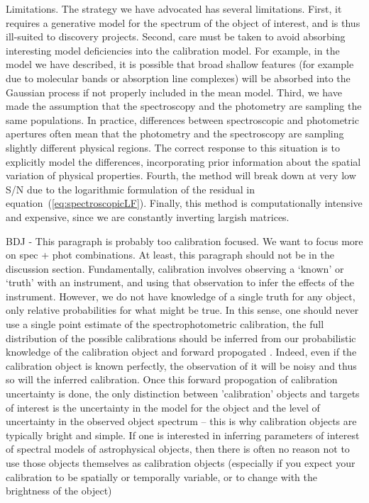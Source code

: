 \documentclass[iop,numberedappendix]{emulateapj}
\begin{document}
Limitations.  The strategy we have advocated has several limitations.
First, it requires a generative model for the spectrum of the object
of interest, and is thus ill-suited to discovery projects.  Second,
care must be taken to avoid absorbing interesting model deficiencies
into the calibration model. For example, in the model we have
described, it is possible that broad shallow features (for example due
to molecular bands or absorption line complexes) will be absorbed into
the Gaussian process if not properly included in the mean
model. Third, we have made the assumption that the spectroscopy and
the photometry are sampling the same populations.  In practice,
differences between spectroscopic and photometric apertures often mean
that the photometry and the spectroscopy are sampling slightly
different physical regions.  The correct response to this situation is
to explicitly model the differences, incorporating prior information
about the spatial variation of physical properties.  Fourth, the
method will break down at very low S/N due to the logarithmic
formulation of the residual in equation~(\ref{eq:spectroscopicLF}).
Finally, this method is computationally intensive and expensive, since
we are constantly inverting largish matrices.

{\color{blue} BDJ - This paragraph is probably too calibration
focused. We want to focus more on spec + phot combinations.  At least,
this paragraph should not be in the discussion section.}
Fundamentally, calibration involves observing a `known' or `truth'
with an instrument, and using that observation to infer the effects of
the instrument.  However, we do not have knowledge of a single truth
for any object, only relative probabilities for what might be true.
In this sense, one should never use a single point estimate of the
spectrophotometric calibration, the full distribution of the possible
calibrations should be inferred from our probabilistic knowledge of
the calibration object and forward propogated
\citep[e.g.][]{lee11}. Indeed, even if the calibration object is known
perfectly, the observation of it will be noisy and thus so will the
inferred calibration. Once this forward propogation of calibration
uncertainty is done, the only distinction between 'calibration'
objects and targets of interest is the uncertainty in the model for
the object and the level of uncertainty in the observed object
spectrum -- this is why calibration objects are typically bright and
simple.  If one is interested in inferring parameters of interest of
spectral models of astrophysical objects, then there is often no
reason not to use those objects themselves as calibration objects
(especially if you expect your calibration to be spatially or
temporally variable, or to change with the brightness of the object)
\end{document}
